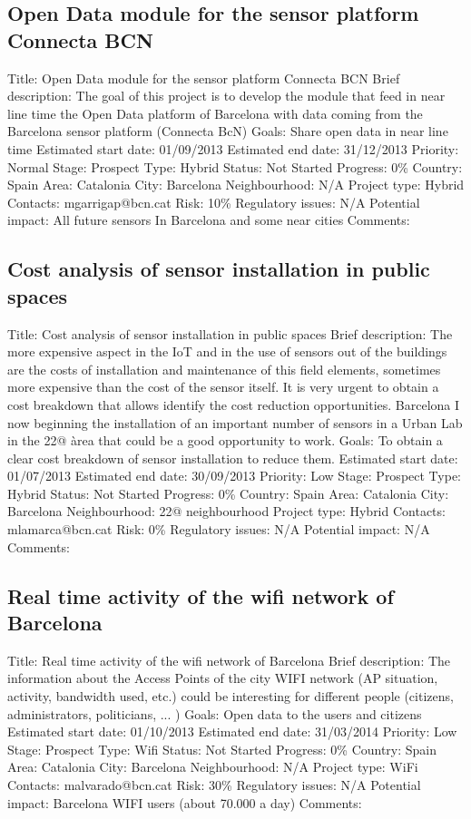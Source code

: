 \documentclass[draftclsnofoot,12pt,journal,onecolumn]{IEEEtran}
\begin{document}
\subsection{Open Data module for the sensor platform Connecta BCN} 
Title: Open Data module for the sensor platform Connecta BCN 
Brief description: The goal of this project is to develop the module that 
feed in near line time the Open Data platform of Barcelona with data coming 
from the Barcelona sensor platform (Connecta BcN) 
Goals: Share open data in near line time 
Estimated start date: 01/09/2013 
Estimated end date: 31/12/2013 
Priority: Normal 
Stage: Prospect 
Type: Hybrid 
Status: Not Started 
Progress: 0\% 
Country: Spain 
Area: Catalonia 
City: Barcelona 
Neighbourhood: N/A 
Project type: Hybrid 
Contacts: mgarrigap@bcn.cat
Risk: 10\% 
Regulatory issues: N/A 
Potential impact: All future sensors In Barcelona and some near cities 
Comments: 
\subsection{Cost analysis of sensor installation in public spaces} 
Title: Cost analysis of sensor installation in public spaces 
Brief description: The more expensive aspect in the IoT and in the use of 
sensors out of the buildings are the costs of installation and maintenance of 
this field elements, sometimes more expensive than the cost of the sensor 
itself.  It is very urgent to obtain a cost breakdown that allows identify 
the cost reduction opportunities.  Barcelona I now beginning the installation 
of an important number of sensors in a Urban Lab in the 22@ àrea that could 
be a good opportunity to work. 
Goals: To obtain a clear cost breakdown of sensor installation to reduce 
them. 
Estimated start date: 01/07/2013 
Estimated end date: 30/09/2013 
Priority: Low 
Stage: Prospect 
Type: Hybrid 
Status: Not Started 
Progress: 0\% 
Country: Spain 
Area: Catalonia 
City: Barcelona 
Neighbourhood: 22@ neighbourhood 
Project type: Hybrid 
Contacts: mlamarca@bcn.cat
Risk: 0\% 
Regulatory issues: N/A 
Potential impact: N/A 
Comments: 
\subsection{Real time activity of the wifi network of Barcelona} 
Title: Real time activity of the wifi network of Barcelona 
Brief description: The information about the Access Points of the city WIFI 
network (AP situation, activity, bandwidth used, etc.) could be interesting 
for different people (citizens, administrators, politicians, ... )
Goals: Open data to the users and citizens 
Estimated start date: 01/10/2013 
Estimated end date: 31/03/2014 
Priority: Low 
Stage: Prospect 
Type: Wifi 
Status: Not Started 
Progress: 0\% 
Country: Spain 
Area: Catalonia 
City: Barcelona 
Neighbourhood: N/A 
Project type: WiFi 
Contacts: malvarado@bcn.cat
Risk: 30\% 
Regulatory issues: N/A 
Potential impact: Barcelona WIFI users (about 70.000 a day) 
Comments: 
\end{document}
